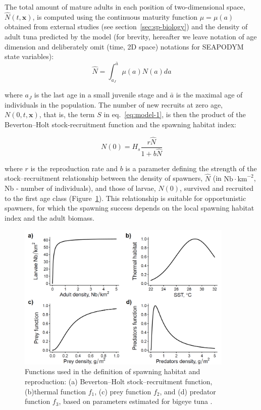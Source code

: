 The total amount of  mature adults in each position of two-dimensional space, $\hat{N}(t,\mathbf{x})$, is computed using the continuous maturity function $\mu=\mu(a)$ obtained from external studies (see section~\ref{sec:sp-biology}) and the density of adult tuna predicted by the model (for brevity, hereafter we leave notation of age dimension and deliberately omit (time, 2D space) notations for SEAPODYM state variables):
\begin{equation}
	\hat{N} = \int_{a_J}^{\bar{a}}{\mu(a)N(a)da}
\label{eq:Nmature}
\end{equation}

\noindent where $a_J$ is the last age in a small juvenile stage and $\bar{a}$ is the maximal age of individuals in the population. The number of new recruits at zero age, $N(0,t,\mathbf{x})$, that is, the term $S$ in eq.~\ref{eq:model-1}, is then the product of the Beverton--Holt stock-recruitment function \citep{Beverton-Holt} and the spawning habitat index:

\begin{equation}
	N(0) = H_s \frac{r\hat{N}}{1+b\hat{N}}
\label{eq:larvae}	
\end{equation}	

\noindent where $r$ is the reproduction rate and $b$ is a parameter defining the strength of the stock--recruitment relationship between the density of spawners, $\hat{N}$ (in $\text{Nb}\cdot\text{km}^{-2}$, Nb - number of individuals), and those of larvae, $N(0)$, survived and recruited to the first age class (Figure~\ref{fig:reproduction-funcs}). This relationship is suitable for opportunistic spawners, for which the spawning success depends on the local spawning habitat index and the adult biomass.   

\begin{figure}
 \centering
 \includegraphics[width=0.92\textwidth]{chapter1/figs/reproduction-funcs}
 \caption{Functions used in the definition of spawning habitat and reproduction: (a) Beverton--Holt stock--recruitment function, (b)thermal function $f_1$, (c) prey function $f_2$, and (d) predator function $f_3$, based on parameters estimated for bigeye tuna \citep{Senina2020b}.}
 \label{fig:reproduction-funcs}
\end{figure}

